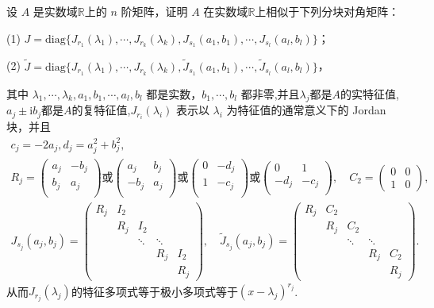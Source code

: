 \documentclass[../../main.tex]{subfiles}
\begin{document}
\begin{theorem}[实数域上的广义Jordan标准型]\label{theorem:实数域上的广义Jordan标准型}
设 $A$ 是实数域$\mathbb{R}$上的 $n$ 阶矩阵，证明 $A$ 在实数域$\mathbb{R}$上相似于下列分块对角矩阵：

(1) $J = \mathrm{diag}\{J_{r_1}(\lambda_1),\cdots,J_{r_k}(\lambda_k),J_{s_1}(a_1,b_1),\cdots,J_{s_l}(a_l,b_l)\}$；

(2) $\widetilde{J} = \mathrm{diag}\{J_{r_1}(\lambda_1),\cdots,J_{r_k}(\lambda_k),\widetilde{J}_{s_1}(a_1,b_1),\cdots,\widetilde{J}_{s_l}(a_l,b_l)\}$，

其中 $\lambda_1,\cdots,\lambda_k,a_1,b_1,\cdots,a_l,b_l$ 都是实数，$b_1,\cdots,b_l$ 都非零,并且$\lambda_j$都是$A$的实特征值,$a_j\pm \mathrm{i}b_j$都是$A$的复特征值,$J_{r_i}(\lambda_i)$ 表示以 $\lambda_i$ 为特征值的通常意义下的 Jordan 块，并且
\begin{gather*}
c_j=-2a_j,d_j=a_j^2+b_j^2,
\\
R_j=\left( \begin{matrix}
a_j&		-b_j\\
b_j&		a_j\\
\end{matrix} \right) \text{或}\left( \begin{matrix}
a_j&		b_j\\
-b_j&		a_j\\
\end{matrix} \right) \text{或}\left( \begin{matrix}
0&		-d_j\\
1&		-c_j\\
\end{matrix} \right) \text{或}\left( \begin{matrix}
0&		1\\
-d_j&		-c_j\\
\end{matrix} \right) 
,\quad C_2 = \begin{pmatrix}0 & 0 \\ 1 & 0\end{pmatrix},
\\
J_{s_j}(a_j,b_j) = 
\begin{pmatrix}
R_j & I_2 & & \\
& R_j & I_2 & \\
& & \ddots & \ddots \\
& & & R_j & I_2 \\
& & & & R_j
\end{pmatrix}, \quad
\widetilde{J}_{s_j}(a_j,b_j) = 
\begin{pmatrix}
R_j & C_2 & & \\
& R_j & C_2 & \\
& & \ddots & \ddots \\
& & & R_j & C_2 \\
& & & & R_j
\end{pmatrix}.
\end{gather*}
从而$J_{r_j}(\lambda_j)$的特征多项式等于极小多项式等于$(x-\lambda_j)^{r_j}$.


\end{theorem}
\end{document}
